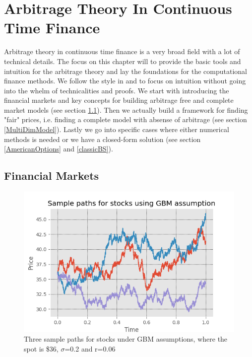 
\chapter{Arbitrage Theory In Continuous Time Finance} %

\label{Chapter2} %

Arbitrage theory in continuous time finance is a very broad field with a lot of technical details. The focus on this chapter will to provide the basic tools and intuition for the arbitrage theory and lay the foundations for the computational finance methods. We follow the style in \parencite{Hull} and \parencite{finKont} to focus on intuition without going into the whelm of technicalities and proofs. We start with introducing the financial markets and key concepts for building arbitrage free and complete market models (see section \ref{FinMarket}). Then we actually build a framework for finding "fair" prices, i.e. finding a complete model with absense of arbitrage (see section \ref{MultiDimModel}). Lastly we go into specific cases where either numerical methods is needed or we have a closed-form solution (see section \ref{AmericanOptions} and \ref{classicBS}).


\section{Financial Markets}\label{FinMarket}

\begin{figure}[th]
\centering
\includegraphics{Figures/samplePath.png}
\decoRule
\caption[Sample Path For Stocks]{Three sample paths for stocks under GBM assumptions, where the spot is \$36, $\sigma$=0.2 and r=0.06}
\label{fig:BM}
\end{figure}


